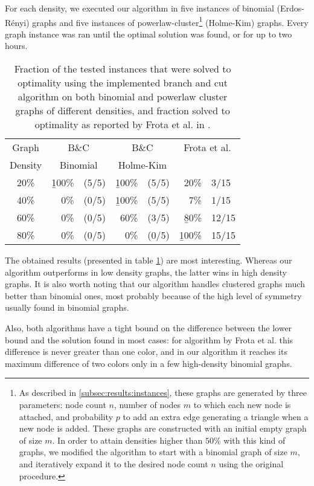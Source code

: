 For each density, we executed our algorithm in five instances of binomial (Erdos-R\'enyi) graphs and five instances of powerlaw-cluster\footnote{As described in \ref{subsec:results:instances}, these graphs are generated by three parameters: node count $n$, number of nodes $m$ to which each new node is attached, and probability $p$ to add an extra edge generating a triangle when a new node is added. These graphs are constructed with an initial empty graph of size $m$. In order to attain densities higher than $50\%$ with this kind of graphs, we modified the algorithm to start with a binomial graph of size $m$, and iteratively expand it to the desired node count $n$ using the original procedure.} (Holme-Kim) graphs. Every graph instance was ran until the optimal solution was found, or for up to two hours.

\begin{table}[h]
\centering
\begin{tabular}{|c|rl|rl|rl|}
\hline
Graph & \multicolumn{2}{|c|}{B\&C} & \multicolumn{2}{|c|}{B\&C} & \multicolumn{2}{|c|}{Frota et al.} \\
Density & \multicolumn{2}{|c|}{Binomial} & \multicolumn{2}{|c|}{Holme-Kim} & \multicolumn{2}{|c|}{} \\
\hline
20\% & \b{100\%} & (5/5) & \b{100\%} & (5/5) & 20\% & 3/15 \\
40\% & 0\% & (0/5) & \b{100\%} & (5/5) & 7\% & 1/15 \\
60\% & 0\% & (0/5) & 60\% & (3/5) & \b{80\%} & 12/15 \\
80\% & 0\% & (0/5) & 0\% & (0/5) & \b{100\%} & 15/15 \\
\hline 
\end{tabular} 
\caption{Fraction of the tested instances that were solved to optimality using the implemented branch and cut algorithm on both binomial and powerlaw cluster graphs of different densities, and fraction solved to optimality as reported by Frota et al. in \cite{frota2010branch}.}
\label{table:final:frotaetal}
\end{table}

The obtained results (presented in table \ref{table:final:frotaetal}) are most interesting. Whereas our algorithm outperforms \cite{frota2010branch} in low density graphs, the latter wins in high density graphs. It is also worth noting that our algorithm handles clustered graphs much better than binomial ones, most probably because of the high level of symmetry usually found in binomial graphs.

Also, both algorithms have a tight bound on the difference between the lower bound and the solution found in most cases: for algorithm by Frota et al. this difference is never greater than one color, and in our algorithm it reaches its maximum difference of two colors only in a few high-density binomial graphs.

